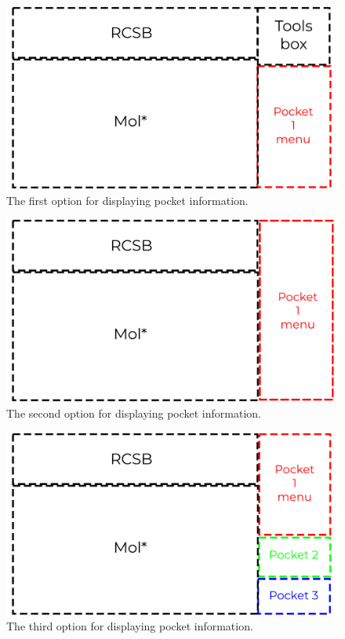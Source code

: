 \begin{figure}[htb]
    \centering
    \includegraphics[width=1\linewidth]{img/dialog_1-svg.pdf}
    \caption{The first option for displaying pocket information.}
    \label{fig:figure-1}
\end{figure}

\begin{figure}[htb]
    \centering
    \includegraphics[width=1\linewidth]{img/dialog_2-svg.pdf}
    \caption{The second option for displaying pocket information.}
    \label{fig:figure-2}
\end{figure}

\begin{figure}[htb]
	\centering
	\includegraphics[width=1\linewidth]{img/dialog_3-svg.pdf}
	\caption{The third option for displaying pocket information.}
	\label{fig:figure-3}
\end{figure}

